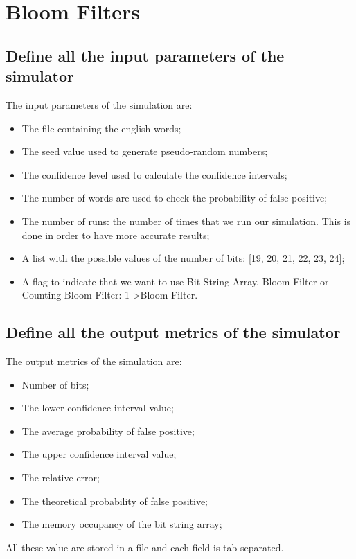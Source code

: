 \documentclass{report}
\begin{document}
		
					\section{Bloom Filters}	 
	 
				\subsection{Define all the input parameters of the simulator}
					The input parameters of the simulation are:
					\begin{itemize}
						\item The file containing the english words;
						\item The seed value used to generate pseudo-random numbers;
						\item The confidence level used to calculate the confidence intervals;
						\item The number of words are used to check the probability of false positive;
						\item The number of runs: the number of times that we run our simulation. This is done in order to have more accurate results;
						\item A list with the possible values of the number of bits: [19, 20, 21, 22, 23, 24];
						\item A flag to indicate that we want to use Bit String Array, Bloom Filter or Counting Bloom Filter: 1->Bloom Filter.
					\end{itemize}
					 
				\subsection{Define all the output metrics of the simulator}
				The output metrics of the simulation are:
				\begin{itemize}
					\item Number of bits;
					\item The lower confidence interval value;
					\item The average probability of false positive;
					\item The upper confidence interval value;
					\item The relative error;
					\item The theoretical probability of false positive;
					\item The memory occupancy of the bit string array;
				\end{itemize}
				All these value are stored in a file and each field is tab separated.
			
\end{document}

